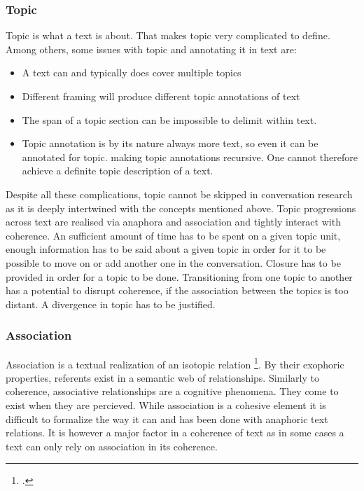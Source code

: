 \documentclass[12pt]{report}
\begin{document}
{\subsubsection{Topic}
\par
    Topic is what a text is about.
    That makes topic very complicated to define.
    Among others, some issues with topic and annotating it in text are:

\begin{itemize}
\item
A text can and typically does cover multiple topics
\item
Different framing will produce different topic annotations of text
\item
The span of a topic section can be impossible to delimit within text.
\item
Topic annotation is by its nature always more text,
            so even it can be annotated for topic.
            making topic annotations recursive.
            One cannot therefore achieve a definite topic description of a text.
\end{itemize}

\par
    Despite all these complications,
    topic cannot be skipped in conversation research
    as it is deeply intertwined with the concepts mentioned above.
    Topic progressions across text are realised via anaphora and association
    and tightly interact with coherence.
    An sufficient amount of time has to be spent on a given topic unit,
    enough information has to be said about a given topic
    in order for it to be possible to move on or add another one in the conversation.
    Closure has to be provided in order for a topic to be done.
    Transitioning from one topic to another has a potential to disrupt coherence,
    if the association between the topics is too distant.
    A divergence in topic has to be justified.

\subsubsection{Association}
\par
    Association is a textual realization of an isotopic relation \footcite{koblizek2015}.
    By their exophoric properties, referents exist in a semantic web of relationships.
    Similarly to coherence, associative relationships are a cognitive phenomena.
    They come to exist when they are percieved.
    While association is a cohesive element it is difficult to formalize
    the way it can and has been done with anaphoric text relations.
    It is however a major factor in a coherence of text as
    in some cases a text can only rely on association in its coherence.

}
\end{document}
